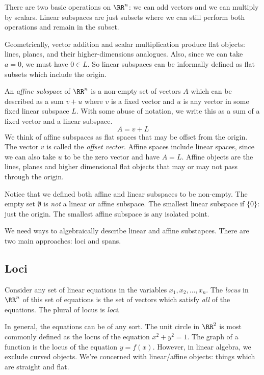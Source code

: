 \documentclass[fleqn]{report}
\begin{document}
There are two basic operations on $\RR^n$:
we can add vectors and we can multiply by scalars. Linear
subspaces are just subsets where we can still perform both
operations and remain in the subset.

Geometrically, vector addition and scalar multiplication
produce flat objects: lines, planes, and their
higher-dimensions analogues. Also, since we can take
$a=0$, we must have $0 \in L$. So linear subspaces can be
informally defined as flat subsets which include the origin.

\begin{defn}
An \emph{affine subspace} of $\RR^n$ is a non-empty set of
vectors $A$ which can be described as a sum $v+u$ where $v$ is
a fixed vector and $u$ is any vector in some fixed linear
subspace $L$. With some abuse of notation, we write this as a
sum of a fixed vector and a linear subspace.
\begin{equation*}
A = v + L
\end{equation*}
We think of affine subspaces as flat spaces that
may be offset from the origin. The vector $v$ is called the
\emph{offset vector}. Affine spaces include linear spaces,
since we can also take $u$ to be the zero vector and have
$A=L$. Affine objects are the lines, planes and higher
dimensional flat objects that may or may not pass through the
origin.
\end{defn}

Notice that we defined both affine and linear subspaces to be
non-empty. The empty set $\emptyset$ is \emph{not} a linear or
affine subspace. The smallest linear subspace if $\{0\}$: just
the origin. The smallest affine subspace is any isolated
point.

We need ways to algebraically describe linear and affine
substapces. There are two main approaches: loci and spans.

\subsection{Loci}
\label{loci}

\begin{defn}
Consider any set of linear equations in the variables
$x_1, x_2, \ldots, x_n$. The \emph{locus} in $\RR^n$ of this
set of equations is the set of vectors which satisfy
\emph{all} of the equations. The plural of locus is
\emph{loci}.
\end{defn}

In general, the equations can be of any sort. The unit circle
in $\RR^2$ is most commonly defined as the locus of the equation
$x^2 + y^2 = 1$. The graph of a function is the locus of the
equation $y = f(x)$. However, in linear algebra, 
we exclude curved objects. We're concerned with
linear/affine objects: things which are straight and flat.
\end{document}
